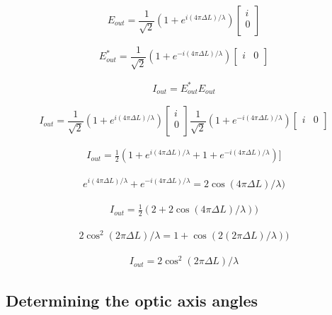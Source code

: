 \documentclass{article}
\begin{document}
\[E_{out} = \frac{1}{\sqrt{2}} (1+e^{i(4\pi\Delta{L})/\lambda}) \begin{bmatrix}
i\\
0\\
\end{bmatrix}
\]

\[E^*_{out} = \frac{1}{\sqrt{2}} (1+e^{-i(4\pi\Delta{L})/\lambda}) \begin{bmatrix}
i & 0\\
\end{bmatrix}
\]

\begin{gather*}
I_{out} = E^*_{out}E_{out}
\end{gather*}

\[I_{out} = \frac{1}{\sqrt{2}} (1+e^{i(4\pi\Delta{L})/\lambda}) \begin{bmatrix}
i\\
0\\
\end{bmatrix}
\frac{1}{\sqrt{2}} (1+e^{-i(4\pi\Delta{L})/\lambda}) \begin{bmatrix}
i & 0\\
\end{bmatrix}
\]

\begin{gather*}
I_{out} = \frac{1}{2} (1+e^{i(4\pi\Delta{L})/\lambda}+1+e^{-i(4\pi\Delta{L})/\lambda})]
\end{gather*}

\begin{gather*}
e^{i(4\pi\Delta{L})/\lambda}+e^{-i(4\pi\Delta{L})/\lambda} = 2 \cos(4\pi\Delta{L})/\lambda)
\end{gather*}

\begin{gather*}
I_{out} = \frac{1}{2} (2+2\cos(4\pi\Delta{L})/\lambda)) 
\end{gather*}


\begin{gather*}
2\cos^2{(2\pi\Delta{L})/\lambda} = 1+\cos(2(2\pi\Delta{L})/\lambda))
\end{gather*}

\begin{gather*}
I_{out} = 2\cos^2{(2\pi\Delta{L})/\lambda}
\end{gather*}


\subsection{ Determining the optic axis angles}
\end{document}
